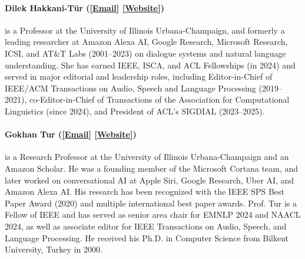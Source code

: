 
\paragraph{Dilek Hakkani-Tür ([\href{mailto:dilek@illinois.edu}{Email}] [\href{https://siebelschool.illinois.edu/about/people/all-faculty/dilek}{Website}])}
is a Professor at the University of Illinois Urbana-Champaign, and formerly a leading researcher at Amazon Alexa AI, Google Research, Microsoft Research, ICSI, and AT\&T Labs (2001–2023) on dialogue systems and natural language understanding. She has earned IEEE, ISCA, and ACL Fellowships (in 2024) and served in major editorial and leadership roles, including Editor-in-Chief of IEEE/ACM Transactions on Audio, Speech and Language Processing (2019–2021), co-Editor-in-Chief of Transactions of the Association for Computational Linguistics (since 2024), and President of ACL’s SIGDIAL (2023–2025).

\paragraph{Gokhan Tur ([\href{mailto:gokhan@illinois.edu}{Email}] [\href{https://siebelschool.illinois.edu/about/people/department-faculty/gokhan}{Website}])}
is a Research Professor at the University of Illinois Urbana-Champaign and an Amazon Scholar. He was a founding member of the Microsoft Cortana team, and later worked on conversational AI at Apple Siri, Google Research, Uber AI, and Amazon Alexa AI. His research has been recognized with the IEEE SPS Best Paper Award (2020) and multiple international best paper awards. Prof. Tur is a Fellow of IEEE and has served as senior area chair for EMNLP 2024 and NAACL 2024, as well as associate editor for IEEE Transactions on Audio, Speech, and Language Processing. He received his Ph.D. in Computer Science from Bilkent University, Turkey in 2000.


